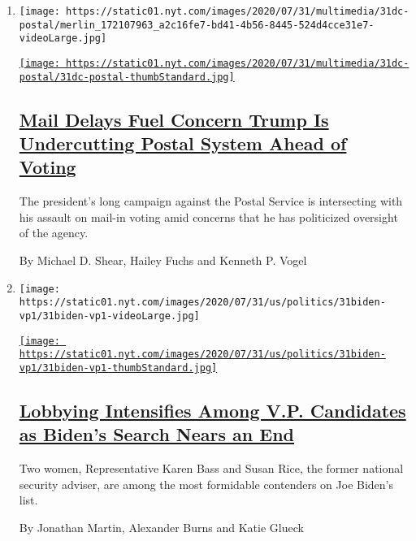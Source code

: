 \begin{enumerate}
\def\labelenumi{\arabic{enumi}.}
\item
  \texttt{[image: https://static01.nyt.com/images/2020/07/31/multimedia/31dc-postal/merlin\_172107963\_a2c16fe7-bd41-4b56-8445-524d4cce31e7-videoLarge.jpg]}

  \href{/2020/07/31/us/politics/trump-usps-mail-delays.html}{\texttt{[image: https://static01.nyt.com/images/2020/07/31/multimedia/31dc-postal/31dc-postal-thumbStandard.jpg]}}

  \hypertarget{mail-delays-fuel-concern-trump-is-undercutting-postal-system-ahead-of-voting}{%
  \subsection{\texorpdfstring{\href{/2020/07/31/us/politics/trump-usps-mail-delays.html}{Mail
  Delays Fuel Concern Trump Is Undercutting Postal System Ahead of
  Voting}}{Mail Delays Fuel Concern Trump Is Undercutting Postal System Ahead of Voting}}\label{mail-delays-fuel-concern-trump-is-undercutting-postal-system-ahead-of-voting}}

  The president's long campaign against the Postal Service is
  intersecting with his assault on mail-in voting amid concerns that he
  has politicized oversight of the agency.

  By Michael D. Shear, Hailey Fuchs and Kenneth P. Vogel
\item
  \texttt{[image: https://static01.nyt.com/images/2020/07/31/us/politics/31biden-vp1/31biden-vp1-videoLarge.jpg]}

  \href{/2020/07/31/us/politics/joseph-biden-vice-president.html}{\texttt{[image: https://static01.nyt.com/images/2020/07/31/us/politics/31biden-vp1/31biden-vp1-thumbStandard.jpg]}}

  \hypertarget{lobbying-intensifies-among-vp-candidates-as-bidens-search-nears-an-end}{%
  \subsection{\texorpdfstring{\href{/2020/07/31/us/politics/joseph-biden-vice-president.html}{Lobbying
  Intensifies Among V.P. Candidates as Biden's Search Nears an
  End}}{Lobbying Intensifies Among V.P. Candidates as Biden's Search Nears an End}}\label{lobbying-intensifies-among-vp-candidates-as-bidens-search-nears-an-end}}

  Two women, Representative Karen Bass and Susan Rice, the former
  national security adviser, are among the most formidable contenders on
  Joe Biden's list.

  By Jonathan Martin, Alexander Burns and Katie Glueck
\end{enumerate}

